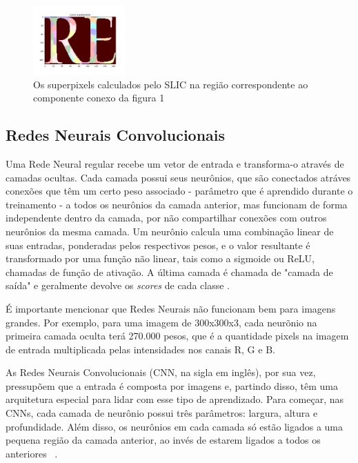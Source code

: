 \documentclass{article}
\begin{document}
		\begin{figure}[H]			
			\caption[Superpixels]
			{Os superpixels calculados pelo SLIC  na região correspondente ao componente conexo da figura 1}
			\centering
			\includegraphics[height=100px]{4.png}			
		\end{figure}
	
	\subsection{Redes Neurais Convolucionais}
		
		Uma Rede Neural regular recebe um vetor de entrada e transforma-o através de camadas ocultas. Cada camada possui seus neurônios, que são conectados atráves conexões que têm um certo peso associado - parâmetro que é aprendido durante o treinamento - a todos os neurônios da camada anterior, mas funcionam de forma independente dentro da camada, por não compartilhar conexões com outros neurônios da mesma camada. Um neurônio calcula uma combinação linear de suas entradas, ponderadas pelos respectivos pesos, e o valor resultante é transformado por uma função não linear, tais como a sigmoide ou ReLU, chamadas de função de ativação. A última camada é chamada de "camada de saída" e geralmente devolve os \textit{scores} de cada classe \cite{Yaser:2012}. 
		
		É importante mencionar que Redes Neurais não funcionam bem para imagens grandes. Por exemplo, para uma imagem de 300x300x3, cada neurõnio na primeira camada oculta terá 270.000 pesos, que é a quantidade pixels na imagem de entrada multiplicada pelas intensidades nos canais R, G e B. 
		
		As Redes Neurais Convolucionais (CNN, na sigla em inglês), por sua vez, pressupõem que a entrada é composta por imagens e, partindo disso, têm uma arquitetura especial para lidar com esse tipo de aprendizado. Para começar, nas CNNs, cada camada de neurônio possui três parâmetros: largura, altura e profundidade. Além disso, os neurônios em cada camada só estão ligados a uma pequena região da camada anterior, ao invés de estarem ligados a todos os anteriores ~\cite{stanford:cnn}. 
		
\end{document}
